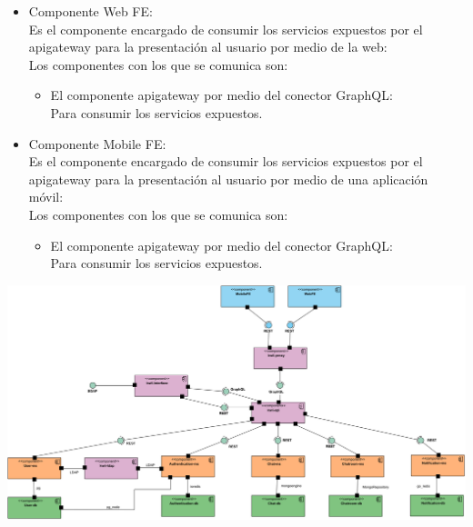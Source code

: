\begin{itemize}
    Es el componente que almacena la información relacionada con las notificaiones en el sistema.
    Los componentes con los que se comunica son:
    \begin{itemize}
        \item El componente Notification por medio del conector go\textunderscore redis:\\
        El componente Notification utilizará Notification DB para almacenar la infomación relacionada con las notificaciones.
    \end{itemize}
    \item Componente Web FE:\\
    Es el componente encargado de consumir los servicios expuestos por el api\textunderscore gateway para la presentación al usuario por medio de la web:\\
    Los componentes con los que se comunica son:
    \begin{itemize}
        \item El componente api\textunderscore gateway por medio del conector GraphQL:\\
        Para consumir los servicios expuestos.
    \end{itemize}
    \item Componente Mobile FE:\\
    Es el componente encargado de consumir los servicios expuestos por el api\textunderscore gateway para la presentación al usuario por medio de una aplicación móvil:\\
    Los componentes con los que se comunica son:
    \begin{itemize}
        \item El componente api\textunderscore gateway por medio del conector GraphQL:\\
        Para consumir los servicios expuestos.
    \end{itemize}
\end{itemize}
\begin{center}
    \includegraphics[width=14cm]{Figures/P3/CYC.png}    
\end{center}

